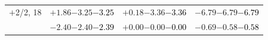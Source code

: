 \documentclass[compress]{beamer}
\begin{document}
\begin{frame}
\begin{tabular}{r | c | c | c}
$+$2/2, 18 & $+1.86$\hspace{0.1 cm}$-3.25$\hspace{0.1 cm}\textcolor{black}{$-3.25$} & $+0.18$\hspace{0.1 cm}$-3.36$\hspace{0.1 cm}\textcolor{black}{$-3.36$} & $-6.79$\hspace{0.1 cm}$-6.79$\hspace{0.1 cm}\textcolor{black}{$-6.79$} \\
           & $-2.40$\hspace{0.1 cm}$-2.40$\hspace{0.1 cm}\textcolor{black}{$-2.39$} & $+0.00$\hspace{0.1 cm}$-0.00$\hspace{0.1 cm}\textcolor{black}{$-0.00$} & $-0.69$\hspace{0.1 cm}$-0.58$\hspace{0.1 cm}\textcolor{black}{$-0.58$} \\
\end{tabular}
\end{frame}
\end{document}
